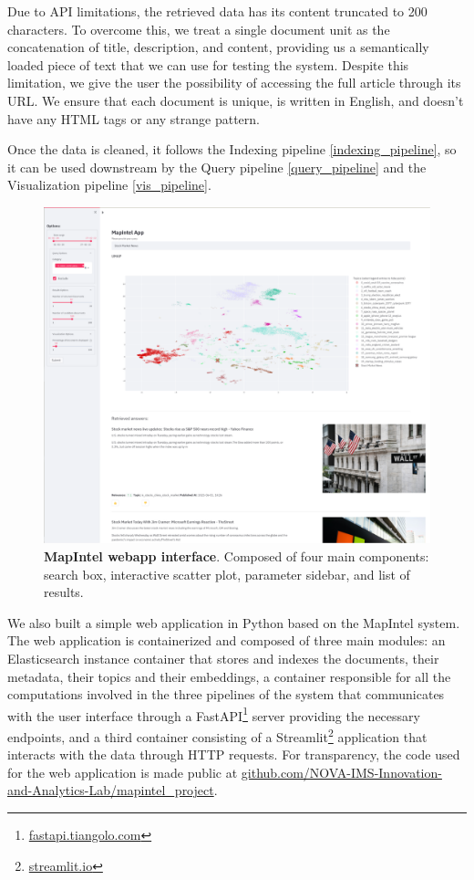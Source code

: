 \documentclass[a4paper]{article}
\begin{document}
Due to API limitations, the retrieved data has its content truncated to 200 characters. To overcome this, we treat a single document unit as the concatenation of title, description, and content, providing us a semantically loaded piece of text that we can use for testing the system. Despite this limitation, we give the user the possibility of accessing the full article through its URL. We ensure that each document is unique, is written in English, and doesn't have any HTML tags or any strange pattern.

Once the data is cleaned, it follows the Indexing pipeline \ref{indexing_pipeline}, so it can be used downstream by the Query pipeline \ref{query_pipeline} and the Visualization pipeline \ref{vis_pipeline}.

\begin{figure}[H]
	\centering
	\includegraphics[scale=0.45]{./assets/ui_screenshot}
	\caption{\textbf{MapIntel webapp interface}. Composed of four main components: search box, interactive scatter plot, parameter sidebar, and list of results.}
	\label{app_ui}
\end{figure}

We also built a simple web application in Python based on the MapIntel system. The web application is containerized and composed of three main modules: an Elasticsearch instance container that stores and indexes the documents, their metadata, their topics and their embeddings, a container responsible for all the computations involved in the three pipelines of the system that communicates with the user interface through a FastAPI\footnote{\href{https://fastapi.tiangolo.com/}{fastapi.tiangolo.com}} server providing the necessary endpoints, and a third container consisting of a Streamlit\footnote{\href{https://streamlit.io/}{streamlit.io}} application that interacts with the data through HTTP requests. For transparency, the code used for the web application is made public at \href{https://github.com/NOVA-IMS-Innovation-and-Analytics-Lab/mapintel_project}{github.com/NOVA-IMS-Innovation-and-Analytics-Lab/mapintel\_project}.
\end{document}
